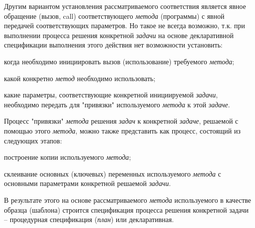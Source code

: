 \begin{SCn}
{Другим вариантом установления рассматриваемого соответствия является явное обращение (вызов, call) соответствующего \textit{метода} (программы) с явной передачей соответствующих параметров. Но такое не всегда возможно, т.к. при выполнении процесса решения конкретной \textit{задачи} на основе декларативной спецификации выполнения этого действия нет возможности установить:
	\begin{scnitemize}
	\item когда необходимо инициировать вызов (использование) требуемого \textit{метода};
	\item какой конкретно \textit{метод} необходимо использовать;
	\item какие параметры, соответствующие конкретной инициируемой \textit{задачи}, необходимо передать для "привязки"{} используемого \textit{метода} к этой \textit{задаче}.
	\end{scnitemize}
	

Процесс "привязки"{} \textit{метода} решения \textit{задач} к конкретной \textit{задаче}, решаемой с помощью этого \textit{метода}, можно также представить как процесс, состоящий из следующих этапов:
	\begin{scnitemize}
	\item построение копии используемого \textit{метода};
	\item склеивание основных (ключевых) переменных используемого \textit{метода} с основными параметрами конкретной решаемой \textit{задачи}.
	\end{scnitemize}

В результате этого на основе рассматриваемого \textit{метода} используемого в качестве образца (шаблона) строится спецификация процесса решения конкретной задачи -- процедурная спецификация (\textit{план}) или декларативная.}

\end{SCn}
